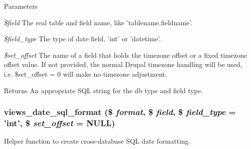 \begin{DoxyParams}{Parameters}
\item[{\em \$field}]The real table and field name, like 'tablename.fieldname'. \item[{\em \$field\_\-type}]The type of date field, 'int' or 'datetime'. \item[{\em \$set\_\-offset}]The name of a field that holds the timezone offset or a fixed timezone offset value. If not provided, the normal Drupal timezone handling will be used, i.e. \$set\_\-offset = 0 will make no timezone adjustment. \end{DoxyParams}
\begin{DoxyReturn}{Returns}
An appropriate SQL string for the db type and field type. 
\end{DoxyReturn}
\hypertarget{handlers_8inc_a7916ceb65f4cbc07601e2acae923374e}{
\subsubsection[{views\_\-date\_\-sql\_\-format}]{\setlength{\rightskip}{0pt plus 5cm}views\_\-date\_\-sql\_\-format (\$ {\em format}, \/  \$ {\em field}, \/  \$ {\em field\_\-type} = {\ttfamily 'int'}, \/  \$ {\em set\_\-offset} = {\ttfamily NULL})}}
\label{handlers_8inc_a7916ceb65f4cbc07601e2acae923374e}
Helper function to create cross-\/database SQL date formatting.


